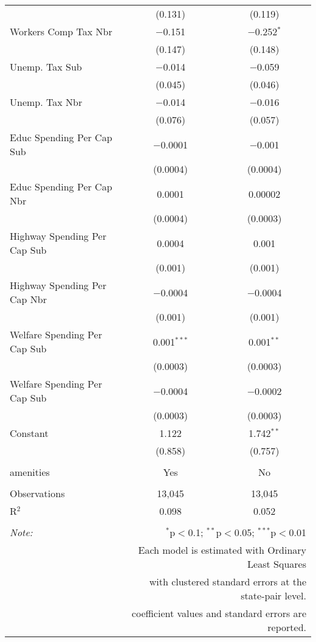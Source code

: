 \begin{table}[!htbp]
\begin{tabular}{@{\extracolsep{5pt}}lcc}
  & (0.131) & (0.119) \\ 
  Workers Comp Tax Nbr & $-$0.151 & $-$0.252$^{*}$ \\ 
  & (0.147) & (0.148) \\ 
  Unemp. Tax Sub & $-$0.014 & $-$0.059 \\ 
  & (0.045) & (0.046) \\ 
  Unemp. Tax Nbr & $-$0.014 & $-$0.016 \\ 
  & (0.076) & (0.057) \\ 
  Educ Spending Per Cap Sub & $-$0.0001 & $-$0.001 \\ 
  & (0.0004) & (0.0004) \\ 
  Educ Spending Per Cap Nbr & 0.0001 & 0.00002 \\ 
  & (0.0004) & (0.0003) \\ 
  Highway Spending Per Cap Sub & 0.0004 & 0.001 \\ 
  & (0.001) & (0.001) \\ 
  Highway Spending Per Cap Nbr & $-$0.0004 & $-$0.0004 \\ 
  & (0.001) & (0.001) \\ 
  Welfare Spending Per Cap Sub & 0.001$^{***}$ & 0.001$^{**}$ \\ 
  & (0.0003) & (0.0003) \\ 
  Welfare Spending Per Cap Sub & $-$0.0004 & $-$0.0002 \\ 
  & (0.0003) & (0.0003) \\ 
  Constant & 1.122 & 1.742$^{**}$ \\ 
  & (0.858) & (0.757) \\ 
 \hline \\[-1.8ex] 
amenities & Yes & No \\ 
\hline \\[-1.8ex] 
Observations & 13,045 & 13,045 \\ 
R$^{2}$ & 0.098 & 0.052 \\ 
\hline 
\hline \\[-1.8ex] 
\textit{Note:}  & \multicolumn{2}{r}{$^{*}$p$<$0.1; $^{**}$p$<$0.05; $^{***}$p$<$0.01} \\ 
 & \multicolumn{2}{r}{Each model is estimated with Ordinary Least Squares} \\ 
 & \multicolumn{2}{r}{with clustered standard errors at the state-pair level.} \\ 
 & \multicolumn{2}{r}{coefficient values and standard errors are reported.} \\ 
\end{tabular} 
\end{table} 
